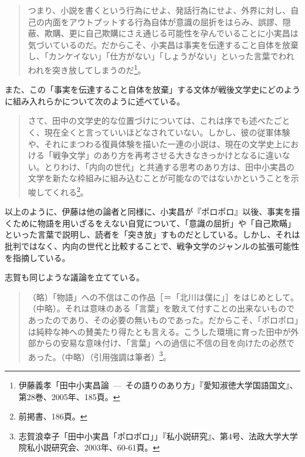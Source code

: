 \begin{quote}
  つまり、小説を書くという行為にせよ、発話行為にせよ、外界に対し、自己の内面をアウトプットする行為自体が意識の屈折をはらみ、誤謬、隠蔽、欺購、更に自己欺購にさえ通じる可能性を孕んでいることに小実昌は気づいているのだ。だからこそ、小実昌は事実を伝達すること自体を放棄し、「カンケイない」「仕方がない」「しょうがない」といった言葉でわれわれを突き放してしまうのだ\footnote{伊藤義孝「田中小実昌論~---~その語りのあり方」『愛知淑徳大学国語国文』、第28巻、2005年、185頁。}。
\end{quote}

また、この「事実を伝達すること自体を放棄」する文体が戦後文学史にどのように組み入れらかについて次のように述べている。

\begin{quote}
  さて、田中の文学史的な位置づけについては、これは序でも述べたごとく、現在全くと言っていいほどなされていない。しかし、彼の従軍体験や、それにまつわる復員体験を描いた一連の小説は、現在の文学史上における「戦争文学」のあり方を再考させる大きなきっかけとなるに違いない。とりわけ、「内向の世代」と共通する思考のあり方は、田中小実昌の文学を新たな枠組みに組み込むことが可能なのではないかということを示唆してくれる\footnote{前掲書、186頁。}。
\end{quote}

以上のように、伊藤は他の論者と同様に、小実昌が『ポロポロ』以後、事実を描くために物語を用いざるをえない自覚について、「意識の屈折」や「自己欺瞞」といった言葉で説明し、読者を「突き放」すものだとしている。しかし、それは批判ではなく、内向の世代と比較することで、戦争文学のジャンルの拡張可能性を指摘している。

志賀も同じような議論を立てている。
\begin{quote}
  （略）「物語」への不信はこの作品［＝「北川は僕に」］をはじめとして。（中略）。それは意味のある「言葉」を敢えて付すことの出来ないものであったのであり、その必要の無いものであった。だからこそ、「ポロポロ」は純粋な神への賛美たり得たとも言える。こうした環境に育った田中が外部からの安易な意味付け、「言葉」への過信に不信の目を向けたの必然であった。（中略）（引用強調は筆者）\footnote{志賀浪幸子「田中小実昌「ポロポロ」」『私小説研究』、第4号、法政大学大学院私小説研究会、2003年、60-61頁。}。
\end{quote}

